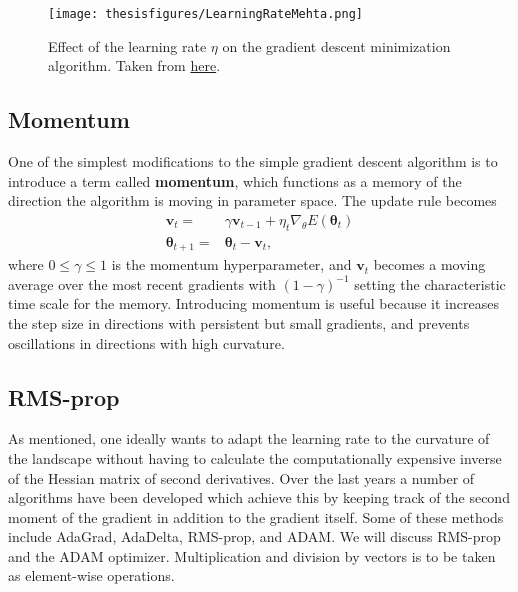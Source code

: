 \documentclass[twoside,english]{uiofysmaster}
\begin{document}
\begin{figure}
\centering
 \texttt{[image: thesisfigures/LearningRateMehta.png]}
 \caption{Effect of the learning rate $\eta$ on the gradient descent minimization algorithm.
 Taken from \href{https://deeplearning4j.org/restrictedboltzmannmachine}{here}.}
 \label{fig:LearningRateMehta}
\end{figure}




\subsection{Momentum}
One of the simplest modifications to the simple gradient descent algorithm is to introduce a term called \textbf{momentum}, which functions as a memory of the direction the algorithm is moving in parameter space. The update rule becomes
\begin{align}
		\mathbf{v}_t =& \gamma \mathbf{v}_{t-1} + \eta_t \nabla_\theta E(\bm{\theta}_t) \\
		\bm{\theta}_{t+1} =& \bm{\theta}_t - \mathbf{v}_t,
\end{align}
where $0 \leq \gamma \leq 1$ is the momentum hyperparameter, and $\mathbf{v}_t$ becomes a moving average over the most recent gradients with $(1-\gamma)^{-1}$ setting the characteristic time scale for the memory. Introducing momentum is useful because it increases the step size in directions with persistent but small gradients, and prevents oscillations in directions with high curvature.



\subsection{RMS-prop}
As mentioned, one ideally wants to adapt the learning rate to the curvature of the landscape without having to calculate the computationally expensive inverse of the Hessian matrix of second derivatives. Over the last years a number of algorithms have been developed which achieve this by keeping track of the second moment of the gradient in addition to the gradient itself. Some of these methods include AdaGrad, AdaDelta, RMS-prop, and ADAM. We will discuss RMS-prop and the ADAM optimizer. Multiplication and division by vectors is to be taken as element-wise operations.
\end{document}
